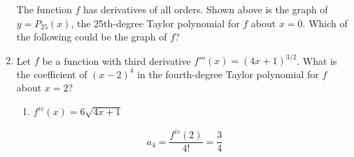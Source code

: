 \documentclass[12pt]{article}
\begin{document}
\begin{enumerate}
\begin{center}
	      \end{center}
	      The function $f$ has derivatives of all orders. Shown above is the graph of $y=P_{25}(x)$, the 25th-degree Taylor polynomial for $f$ about $x=0$. Which of the following could be the graph of $f$?
	      \begin{center}
	      \end{center}
	\item Let $f$ be a function with third derivative $f'''(x)=(4x+1)^{3/2}$. What is the coefficient of $(x-2)^4$ in the fourth-degree Taylor polynomial for $f$  about $x=2$?
	          
	      \begin{enumerate}
	      	\item $f^{iv}(x) = 6\sqrt{4x+1}$
	      \end{enumerate}
	      $$\boxed{a_4 = \frac{f^{iv}(2)}{4!} = \frac{3}{4}}$$
\end{enumerate}
\end{document}
